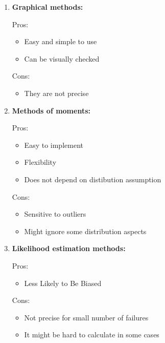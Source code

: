 \documentclass{article}
\begin{document}
\begin{enumerate}[label=(\alph*)]
    \item \textbf{Graphical methods:}

          Pros:
          \begin{itemize}
              \item Easy and simple to use
              \item Can be visually checked
          \end{itemize}
          Cons:
          \begin{itemize}
              \item They are not precise
          \end{itemize}

    \item \textbf{Methods of moments:}

          Pros:
          \begin{itemize}
              \item Easy to implement
              \item Flexibility
              \item  Does not depend on distibution assumption
          \end{itemize}
          Cons:
          \begin{itemize}
              \item Sensitive to outliers
              \item Might ignore some distribution aspects
          \end{itemize}

    \item \textbf{Likelihood estimation methods:}

          Pros:
          \begin{itemize}
              \item Less Likely to Be Biased
          \end{itemize}
          Cons:
          \begin{itemize}
              \item Not precise for small number of failures
              \item It might be hard to calculate in some cases
          \end{itemize}
\end{enumerate}

\end{document}
